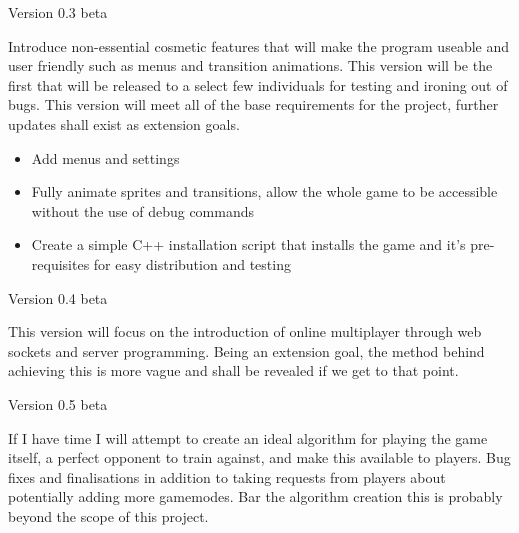 \documentclass{article}
\begin{document}
Version 0.3 beta

Introduce non-essential cosmetic features that will make the program useable and user friendly such as menus and transition animations. This version will be the first that will be released to a select few individuals for testing and ironing out of bugs. This version will meet all of the base requirements for the project, further updates shall exist as extension goals.
\begin{itemize}
    \renewcommand\labelitemi{--}
    \item Add menus and settings
    \item Fully animate sprites and transitions, allow the whole game to be accessible without the use of debug commands
    \item Create a simple C++ installation script that installs the game and it's pre-requisites for easy distribution and testing
\end{itemize}

Version 0.4 beta

This version will focus on the introduction of online multiplayer through web sockets and server programming. Being an extension goal, the method behind achieving this is more vague and shall be revealed if we get to that point.

\vspace{0.3cm}

Version 0.5 beta

If I have time I will attempt to create an ideal algorithm for playing the game itself, a perfect opponent to train against, and make this available to players. Bug fixes and finalisations in addition to taking requests from players about potentially adding more gamemodes. Bar the algorithm creation this is probably beyond the scope of this project.
\end{document}
